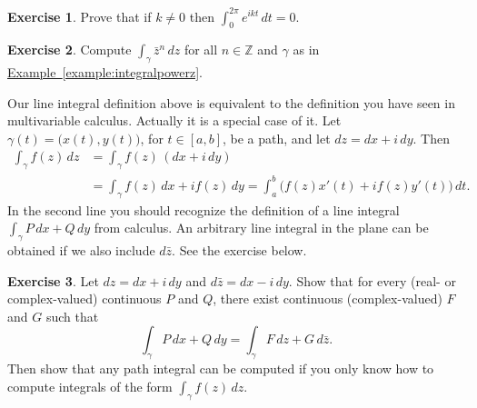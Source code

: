 \documentclass[12pt,openany]{book}
\newcommand{\R}{{\mathbb{R}}}
\newcommand{\Z}{{\mathbb{Z}}}
\theoremstyle{plain}
\theoremstyle{remark}
\theoremstyle{definition}
\newenvironment{exbox}{%
    \def\FrameCommand{\vrule width 1pt \relax\hspace{10pt}}%
    \MakeFramed{\advance\hsize-\width\FrameRestore}%
}{%
    \endMakeFramed
}
\theoremstyle{exercise}
\newtheorem{exercise}{Exercise}[section]
\theoremstyle{example}
\newcommand{\exampleref}[1]{\hyperref[#1]{Example~\ref*{#1}}}
\begin{document}
\begin{exbox}
\begin{exercise}
Prove that if $k\not= 0$ then $\int_0^{2\pi} e^{ik t} \, dt = 0$.
\end{exercise}

\begin{exercise}
Compute $\int_\gamma \bar{z}^n \, dz$ for all $n \in \Z$ and $\gamma$ as in
\exampleref{example:integralpowerz}.
\end{exercise}
\end{exbox}

Our line integral definition above is equivalent to the definition you
have seen in multivariable calculus.  Actually it is a special case of it.
Let $\gamma(t) = \bigl( x(t), y(t) \bigr)$, for $t \in [a,b]$, be a path,
and let $dz = dx + i\, dy$.
Then
\begin{equation*}
\begin{split}
\int_{\gamma} f(z) \, dz
& =
\int_{\gamma} f(z) \, (dx + i\, dy)
\\
& =
\int_{\gamma} f(z) \, dx + i f(z) \, dy
=
\int_a^b \bigl( f(z) x'(t) + i f(z) y'(t) \bigr) \, dt .
\end{split}
\end{equation*}
In the second line you should recognize the definition of a line integral
$\int_\gamma P\,dx + Q \, dy$ from calculus.  An arbitrary
line integral in the plane can be obtained if we also include $d\bar{z}$.  See the
exercise below.

\begin{exbox}
\begin{exercise} \label{exercise:realpathintegral}
Let $dz = dx + i \, dy$ and 
$d\bar{z} = dx - i \, dy$.  Show that for every (real- or complex-valued) continuous $P$ and $Q$,
there exist continuous (complex-valued) $F$ and $G$ such that
\begin{equation*}
\int_{\gamma} P \, dx + Q \, dy
=
\int_{\gamma} F \, dz + G \, d\bar{z} .
\end{equation*}
Then show that any path integral
can be computed if you only know how to compute integrals of the form $\int_\gamma f(z) \, dz$.
\end{exercise}
\end{exbox}
\end{document}

